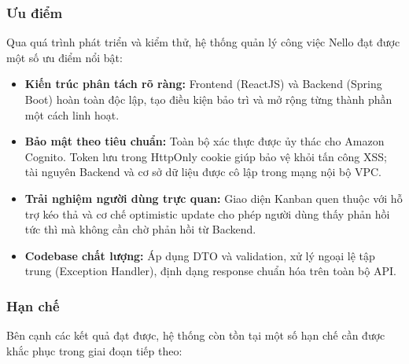\subsubsection{Ưu điểm}

Qua quá trình phát triển và kiểm thử, hệ thống quản lý công việc Nello đạt được một số ưu điểm nổi bật:

\begin{itemize}
    \item \textbf{Kiến trúc phân tách rõ ràng:} Frontend (ReactJS) và Backend (Spring Boot) hoàn toàn độc lập, tạo điều kiện bảo trì và mở rộng từng thành phần một cách linh hoạt.
    \item \textbf{Bảo mật theo tiêu chuẩn:} Toàn bộ xác thực được ủy thác cho Amazon Cognito. Token lưu trong HttpOnly cookie giúp bảo vệ khỏi tấn công XSS; tài nguyên Backend và cơ sở dữ liệu được cô lập trong mạng nội bộ VPC.
    \item \textbf{Trải nghiệm người dùng trực quan:} Giao diện Kanban quen thuộc với hỗ trợ kéo thả và cơ chế optimistic update cho phép người dùng thấy phản hồi tức thì mà không cần chờ phản hồi từ Backend.
    \item \textbf{Codebase chất lượng:} Áp dụng DTO và validation, xử lý ngoại lệ tập trung (Exception Handler), định dạng response chuẩn hóa trên toàn bộ API.
\end{itemize}

\subsubsection{Hạn chế}

Bên cạnh các kết quả đạt được, hệ thống còn tồn tại một số hạn chế cần được khắc phục trong giai đoạn tiếp theo:

